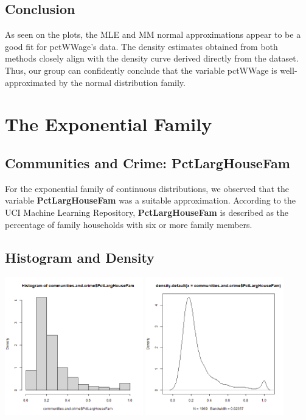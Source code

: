 \documentclass[12pt, letterpaper]{report}
\begin{document}
\section{Conclusion}
As seen on the plots, the MLE and MM normal approximations appear to be a good fit for pctWWage's data. The density estimates obtained from both methods closely align with the density curve derived directly from the dataset. 
Thus, our group can confidently conclude that the variable pctWWage is well-approximated by the normal distribution family.

\maketitle
\chapter{The Exponential Family}
\section{Communities and Crime: PctLargHouseFam}

For the exponential family of continuous distributions, we observed that the variable \textbf{PctLargHouseFam} was a suitable approximation. 
According to the UCI Machine Learning Repository, \textbf{PctLargHouseFam} is described as the percentage of family households with six or more family members. 

\section{Histogram and Density}


\begin{center}
\includegraphics[width=0.45\textwidth]{exponential/PctLargHouseFam_hist}
\includegraphics[width=0.45\textwidth]{exponential/PctLargHouseFam_density}
\end{center}
\end{document}
